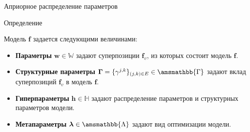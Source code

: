 \documentclass[usenames,dvipsnames,11pt,pdf,utf8,russian,aspectratio=43]{beamer}
\begin{document}
\begin{frame}{Априорное распределение параметров}
\begin{block}{Определение}
\end{block}
Модель $\mathbf{f}$ задается следующими величинами:
\begin{itemize}
\item \textbf{Параметры} $\mathbf{w} \in \mathbb{W}$ задают суперпозиции $\mathbf{f}_v$, из которых состоит модель $\mathbf{f}$.
\item \textbf{Структурные параметры} $\boldsymbol{\Gamma}=\{\gamma^{j,k}\}_{(j,k)\in E} \in \amsmathbb{\Gamma}$ задают вклад суперпозиций $\mathbf{f}_v$ в модель $\mathbf{f}$.
\item \textbf{Гиперпараметры} $\mathbf{h} \in \mathbb{H}$ задают распределение параметров и структурных параметров модели.
\item \textbf{Метапараметры} $\boldsymbol{\lambda} \in \amsmathbb{\Lambda}$ задают вид оптимизации модели.
\end{itemize}

\end{frame}
\end{document}
